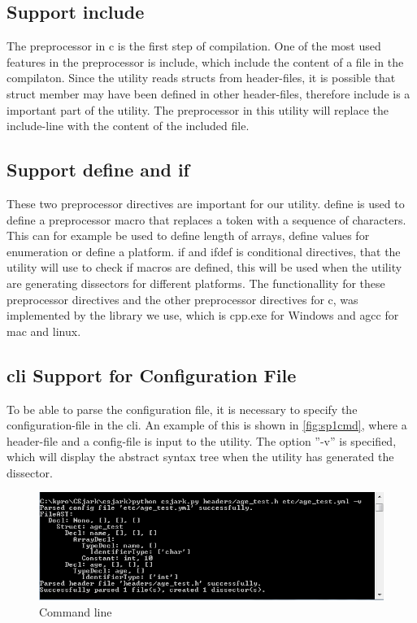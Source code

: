 \subsection{Support \gls{include}}
The \gls{preprocessor} in \Gls{c} is the first step of compilation. One of the most used 
features in the \gls{preprocessor} is \gls{include}, which include the content of a file 
in the compilaton. Since the \gls{utility} reads \glspl{struct} from \gls{header}-files, it is 
possible that \gls{struct} \gls{member} may have been defined in other \gls{header}-files, 
therefore \gls{include} is a important part of the \gls{utility}. The \gls{preprocessor} in 
this \gls{utility} will replace the \gls{include}-line with the content of the included file.

\subsection{Support \gls{define} and \gls{if}}
These two \gls{preprocessor} directives are important for our \gls{utility}. \gls{define} is 
used to define a \gls{preprocessor} macro that replaces a token with a 
sequence of characters. This can for example be used to define length of 
\glspl{array}, define values for enumeration or define a platform. \gls{if} and \gls{ifdef} 
is conditional directives, that the \gls{utility} will use to check if macros are 
defined, this will be used when the \gls{utility} are generating \glspl{dissector} for 
different platforms. The functionallity for these \gls{preprocessor} directives and 
the other \gls{preprocessor} directives for \Gls{c}, was implemented by the \gls{library} we 
use, which is cpp.exe for \Gls{Windows} and \gls{agcc} for \Gls{mac} and \Gls{linux}.

\subsection{\gls{cli} Support for Configuration File}
To be able to parse the configuration file, it is necessary to specify the 
configuration-file in the \gls{cli}. An example of this is shown in 
\autoref{fig:sp1cmd}, where a \gls{header}-file and a config-file is input to the 
\gls{utility}. The option ''-v'' is specified, which will display the abstract 
syntax tree when the \gls{utility} has generated the \gls{dissector}.

\begin{figure}[ht]
	\includegraphics[width=\textwidth]{./sprints/img/cmd_agetest_run}
	\caption{Command line\label{fig:sp1cmd}}
\end{figure}

